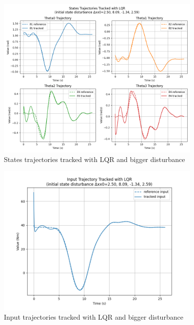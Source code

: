 \documentclass[a4paper,11pt,oneside]{book}
\begin{document}
\begin{figure}[H]
    \centering
    \includegraphics[width=0.9\textwidth]{States_Trajectories_Tracked_with_LQR_dist2_T3.png}
    \caption{States trajectories tracked with LQR and bigger disturbance}
    \label{fig:enter-label}
\end{figure}
\begin{figure}[H]
    \centering
    \includegraphics[width=0.9\textwidth]{Traj_tracked_dist2(I)_T3.png}
    \caption{Input trajectories tracked with LQR and bigger disturbance}
    \label{fig:enter-label}
\end{figure}
\end{document}

